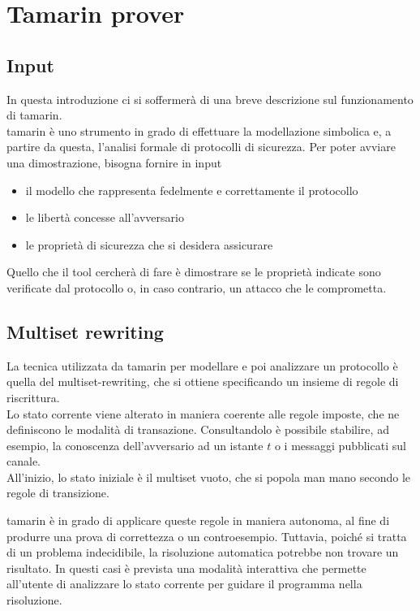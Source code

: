 \section{Tamarin prover}

\subsection{Input}

In questa introduzione ci si soffermerà di una breve descrizione sul funzionamento di \gls{tamarin}. \\
\gls{tamarin} è uno strumento in grado di effettuare la modellazione simbolica e, a partire da questa, l'analisi formale di protocolli di sicurezza.
Per poter avviare una dimostrazione, bisogna fornire in input
\begin{itemize}
    \item il modello che rappresenta fedelmente e correttamente il protocollo
    \item le libertà concesse all'avversario
    \item le proprietà di sicurezza che si desidera assicurare
\end{itemize}
Quello che il tool cercherà di fare è dimostrare se le proprietà indicate sono verificate dal protocollo o, in caso contrario, un attacco che le comprometta.

\subsection{Multiset rewriting}
La tecnica utilizzata da \gls{tamarin} per modellare e poi analizzare un protocollo è quella del \gls{multiset-rewriting}, che si ottiene specificando un insieme di regole di riscrittura. \\

Lo stato corrente viene alterato in maniera coerente alle regole imposte, che ne definiscono le modalità di transazione.
Consultandolo è possibile stabilire, ad esempio, la conoscenza dell'avversario ad un istante $t$ o i messaggi pubblicati sul canale. \\
All'inizio, lo stato iniziale è il multiset vuoto, che si popola man mano secondo le regole di transizione.

\gls{tamarin} è in grado di applicare queste regole in maniera autonoma, al fine di produrre una prova di correttezza o un controesempio.
Tuttavia, poiché si tratta di un problema indecidibile, la risoluzione automatica potrebbe non trovare un risultato.
In questi casi è prevista una modalità interattiva che permette all'utente di analizzare lo stato corrente per guidare il programma nella risoluzione.

